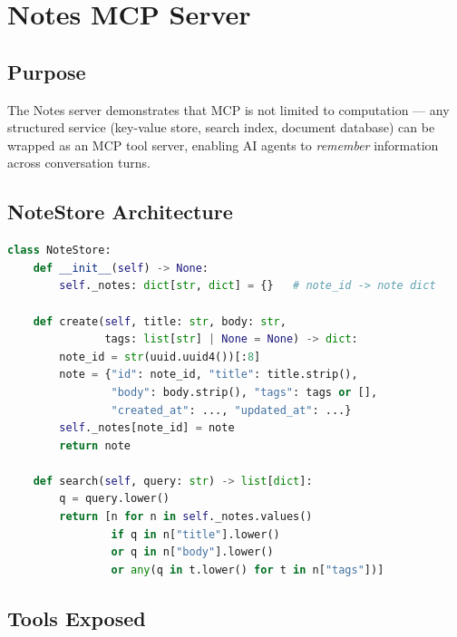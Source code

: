 \documentclass[11pt,a4paper]{article}
\begin{document}
\newpage
\section{Notes MCP Server}

\subsection{Purpose}

The Notes server demonstrates that MCP is not limited to computation — any
structured service (key-value store, search index, document database) can be
wrapped as an MCP tool server, enabling AI agents to \emph{remember} information
across conversation turns.

\subsection{NoteStore Architecture}

\begin{lstlisting}[language=Python, caption={In-memory NoteStore}]
class NoteStore:
    def __init__(self) -> None:
        self._notes: dict[str, dict] = {}   # note_id -> note dict

    def create(self, title: str, body: str,
               tags: list[str] | None = None) -> dict:
        note_id = str(uuid.uuid4())[:8]
        note = {"id": note_id, "title": title.strip(),
                "body": body.strip(), "tags": tags or [],
                "created_at": ..., "updated_at": ...}
        self._notes[note_id] = note
        return note

    def search(self, query: str) -> list[dict]:
        q = query.lower()
        return [n for n in self._notes.values()
                if q in n["title"].lower()
                or q in n["body"].lower()
                or any(q in t.lower() for t in n["tags"])]
\end{lstlisting}

\subsection{Tools Exposed}
\end{document}
